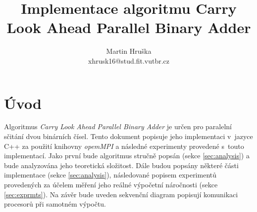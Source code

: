 \documentclass[a4paper, 12pt]{article}
\title{Implementace algoritmu Carry Look Ahead Parallel Binary Adder}
\author{Martin Hruška\\xhrusk16@stud.fit.vutbr.cz}
\date{}
\begin{document}
\maketitle

\section{Úvod}
\label{sec:intro}
Algoritmus \emph{Carry Look Ahead Parallel Binary Adder} je určen pro paralelní sčitání dvou binárních čísel.
Tento dokument popisuje jeho implementaci v~jazyce C++ za použití knihovny \emph{opemMPI} a následné experimenty
provedené s~touto implementací.
Jako první bude algoritmus stručně popsán (sekce \ref{sec:analysis}) a bude analyzována jeho teoretická složitost.
Dále budou popsány některé části implementace (sekce \ref{sec:analysis}), následované popisem experimentů
provedených za účelem měření jeho reálné výpočetní náročnosti (sekce \ref{sec:exprmts}).
Na závěr bude uveden sekvenční diagram popisují komunikaci procesorů při samotném výpočtu.
\end{document}
